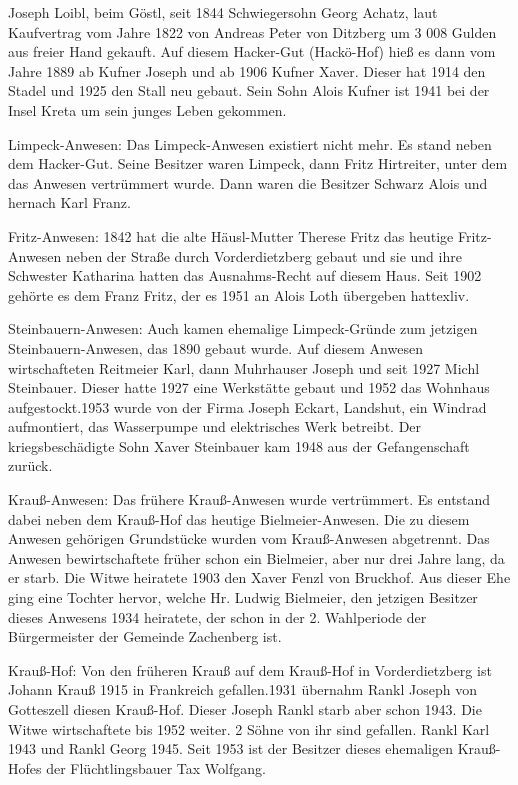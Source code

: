 \documentclass[12pt,a4pager]{book}
\begin{document}
Joseph Loibl, beim Göstl, seit 1844 Schwiegersohn Georg Achatz, laut Kaufvertrag
vom Jahre 1822 von Andreas Peter von Ditzberg um 3 008 Gulden aus freier Hand
gekauft. Auf diesem Hacker-Gut (Hackö-Hof) hieß es dann vom Jahre 1889 ab Kufner
Joseph und ab 1906 Kufner Xaver. Dieser hat 1914 den Stadel und 1925 den Stall
neu gebaut. Sein Sohn Alois Kufner ist 1941 bei der Insel Kreta um sein junges
Leben gekommen.

Limpeck-Anwesen: Das Limpeck-Anwesen existiert nicht mehr. Es stand neben dem
Hacker-Gut. Seine Besitzer waren Limpeck, dann Fritz Hirtreiter, unter dem das
Anwesen vertrümmert wurde. Dann waren die Besitzer Schwarz Alois und hernach
Karl Franz.

Fritz-Anwesen: 1842 hat die alte Häusl-Mutter Therese Fritz das heutige
Fritz-Anwesen neben der Straße durch Vorderdietzberg gebaut und sie und ihre
Schwester Katharina hatten das Ausnahms-Recht auf diesem Haus. Seit 1902 gehörte
es dem Franz Fritz, der es 1951 an Alois Loth übergeben hattexliv.

Steinbauern-Anwesen: Auch kamen ehemalige Limpeck-Gründe zum jetzigen
Steinbauern-Anwesen, das 1890 gebaut wurde. Auf diesem Anwesen wirtschafteten
Reitmeier Karl, dann Muhrhauser Joseph und seit 1927 Michl Steinbauer. Dieser
hatte 1927 eine Werkstätte gebaut und 1952 das Wohnhaus aufgestockt.1953 wurde
von der Firma Joseph Eckart, Landshut, ein Windrad aufmontiert, das Wasserpumpe
und elektrisches Werk betreibt. Der kriegsbeschädigte Sohn Xaver Steinbauer kam
1948 aus der Gefangenschaft zurück.

Krauß-Anwesen: Das frühere Krauß-Anwesen wurde vertrümmert. Es entstand dabei
neben dem Krauß-Hof das heutige Bielmeier-Anwesen. Die zu diesem Anwesen
gehörigen Grundstücke wurden vom Krauß-Anwesen abgetrennt. Das Anwesen
bewirtschaftete früher schon ein Bielmeier, aber nur drei Jahre lang, da er
starb. Die Witwe heiratete 1903 den Xaver Fenzl von Bruckhof. Aus dieser Ehe
ging eine Tochter hervor, welche Hr. Ludwig Bielmeier, den jetzigen Besitzer
dieses Anwesens 1934 heiratete, der schon in der 2. Wahlperiode der
Bürgermeister der Gemeinde Zachenberg ist.

Krauß-Hof: Von den früheren Krauß auf dem Krauß-Hof in Vorderdietzberg ist
Johann Krauß 1915 in Frankreich gefallen.1931 übernahm Rankl Joseph von
Gotteszell diesen Krauß-Hof. Dieser Joseph Rankl starb aber schon 1943. Die
Witwe wirtschaftete bis 1952 weiter. 2 Söhne von ihr sind gefallen. Rankl Karl
1943 und Rankl Georg 1945. Seit 1953 ist der Besitzer dieses ehemaligen
Krauß-Hofes der Flüchtlingsbauer Tax Wolfgang.
\end{document}
